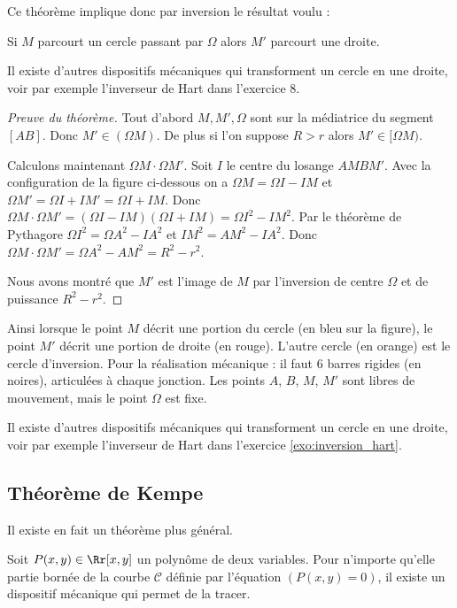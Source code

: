 \documentclass[11pt,class=report,crop=false]{standalone}
\begin{document}
Ce théorème implique donc par inversion le résultat voulu :
\begin{corollaire}
Si $M$ parcourt un cercle passant par $\Omega$ alors
$M'$ parcourt une droite.
\end{corollaire}


Il existe d'autres dispositifs mécaniques qui transforment
un cercle en une droite, voir par exemple l'inverseur de Hart
dans l'exercice 8.


\begin{proof}[Preuve du théorème]
Tout d'abord $M,M',\Omega$ sont sur la médiatrice du segment $[AB]$.
Donc $M' \in (\Omega M)$. De plus si l'on suppose $R>r$ alors
$M' \in [\Omega M)$.

Calculons maintenant $\Omega M \cdot \Omega M'$.
Soit $I$ le centre du losange $AMBM'$.
Avec la configuration de la figure ci-dessous on a $\Omega M= \Omega I - IM$ et $\Omega M' = \Omega I + IM'= \Omega I + IM$.
Donc $\Omega M \cdot \Omega M' = (\Omega I - IM) (\Omega I + IM) = \Omega I ^2 - IM^2.$
Par le théorème de Pythagore $\Omega I^2 = \Omega A^2 - IA^2$ et 
$IM^2 = AM^2 - IA^2$. Donc $\Omega M\cdot \Omega M'= \Omega A^2 - AM^2 = R^2 - r^2$.


Nous avons montré que $M'$ est l'image de $M$ par l'inversion de centre $\Omega$
et de puissance $R^2 - r^2$.
\end{proof}

Ainsi lorsque le point $M$ décrit une portion du cercle (en bleu sur la figure), 
le point $M'$ décrit une portion de droite (en rouge). L'autre cercle (en orange) est le cercle d'inversion.
Pour la réalisation mécanique : il faut $6$ barres rigides (en noires), articulées à chaque jonction.
Les points $A$, $B$, $M$, $M'$ sont libres de mouvement, mais le point $\Omega$ est fixe.

Il existe d'autres dispositifs mécaniques qui transforment
un cercle en une droite, voir par exemple l'inverseur de Hart
dans l'exercice \ref{exo:inversion_hart}.

\subsection{Théorème de Kempe}

Il existe en fait un théorème plus général.
\begin{theoreme}
Soit $P(x,y) \in \Rr[x,y]$ un polynôme de deux variables.
Pour n'importe qu'elle partie bornée de la courbe $\mathcal{C}$ définie par l'équation $(P(x,y)=0)$, 
il existe un dispositif 
mécanique qui permet de la tracer.
\end{theoreme}
\end{document}
